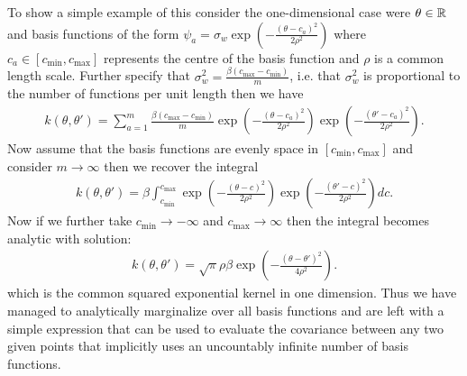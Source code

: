 To show a simple example of this consider the one-dimensional case were $\theta \in \mathbb{R}$ and basis functions of the form  $\psi_a = \sigma_w\exp \left(-\frac{\left( \theta-c_a\right)^2}{2 \rho^2}\right)$ where $c_a \in \left[c_{\min},c_{\max}\right]$ represents the centre of the basis function and $\rho$ is a common length scale.  Further specify that $\sigma_w^2 = \frac{\beta \left(c_{\max}-c_{\min}\right)}{m}$, i.e. that $\sigma_w^2$ is proportional to the number of functions per unit length then we have
\begin{align}
\label{eq:opt:kSeqExpFinite}
k\left(\theta,\theta'\right) = \sum_{a=1}^{m} \frac{\beta \left(c_{\max}-c_{\min}\right)}{m} \exp \left(-\frac{\left( \theta-c_a\right)^2}{2 \rho^2}\right) \exp \left(-\frac{\left(\theta'-c_a\right)^2}{2 \rho^2}\right).
\end{align}
Now assume that the basis functions are evenly space in $\left[c_{\min},c_{\max}\right]$ and consider $m \rightarrow \infty$ then we recover the integral
\begin{align}
\label{eq:opt:kSeqExpIntegral}
k\left(\theta,\theta'\right) = \beta \int_{c_{\min}}^{c_{\max}}  \exp \left(-\frac{\left( \theta-c\right)^2}{2 \rho^2}\right) \exp \left(-\frac{\left(\theta'-c\right)^2}{2 \rho^2}\right) dc.
\end{align}
Now if we further take $c_{\min} \rightarrow -\infty$ and $c_{\max} \rightarrow \infty$ then the integral becomes analytic with solution:
\begin{align}
\label{eq:opt:seqExpProof}
k\left(\theta,\theta'\right) = \sqrt{\pi} \rho \beta \exp \left(-\frac{\left(\theta-\theta'\right)^2}{4 \rho^2}\right).
\end{align}
which is the common squared exponential kernel in one dimension.  Thus we have managed to analytically marginalize over all basis functions and are left with a simple expression that can be used to evaluate the covariance between any two given points that implicitly uses an uncountably infinite number of basis functions.

